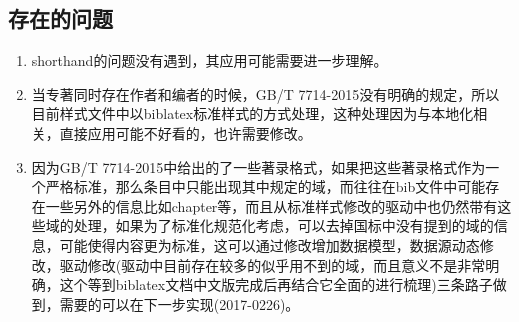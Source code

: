 \subsection{存在的问题}

\begin{enumerate}





  \item shorthand的问题没有遇到，其应用可能需要进一步理解。

  \item 当专著同时存在作者和编者的时候，GB/T 7714-2015没有明确的规定，所以目前样式文件中以biblatex标准样式的方式处理，这种处理因为与本地化相关，直接应用可能不好看的，也许需要修改。

  \item 因为GB/T 7714-2015中给出的了一些著录格式，如果把这些著录格式作为一个严格标准，那么条目中只能出现其中规定的域，而往往在bib文件中可能存在一些另外的信息比如chapter等，而且从标准样式修改的驱动中也仍然带有这些域的处理，如果为了标准化规范化考虑，可以去掉国标中没有提到的域的信息，可能使得内容更为标准，这可以通过修改增加数据模型，数据源动态修改，驱动修改(驱动中目前存在较多的似乎用不到的域，而且意义不是非常明确，这个等到biblatex文档中文版完成后再结合它全面的进行梳理)三条路子做到，需要的可以在下一步实现(2017-0226)。
\end{enumerate}

